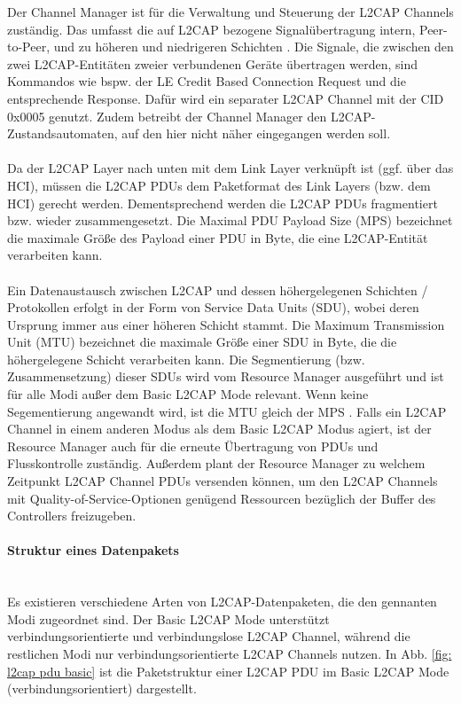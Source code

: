 Der Channel Manager ist für die Verwaltung und Steuerung der L2CAP Channels zuständig. Das umfasst die auf L2CAP bezogene Signalübertragung intern, Peer-to-Peer, und zu höheren und niedrigeren Schichten \cite{BtSpec4.0_1390}. 
Die Signale, die zwischen den zwei L2CAP-Entitäten zweier verbundenen Geräte übertragen werden, sind Kommandos wie bspw. der LE Credit Based Connection Request und die entsprechende Response. Dafür wird ein separater L2CAP Channel mit der CID 0x0005 genutzt. Zudem betreibt der Channel Manager den L2CAP-Zustandsautomaten, auf den hier nicht näher eingegangen werden soll.
\\\\
Da der L2CAP Layer nach unten mit dem Link Layer verknüpft ist (ggf. über das HCI), müssen die L2CAP PDUs dem Paketformat des Link Layers (bzw. dem HCI) gerecht werden. Dementsprechend werden die L2CAP PDUs fragmentiert bzw. wieder zusammengesetzt. Die Maximal PDU Payload Size (MPS) bezeichnet die maximale Größe des Payload einer PDU in Byte, die eine L2CAP-Entität verarbeiten kann.
\\\\
Ein Datenaustausch zwischen L2CAP und dessen höhergelegenen Schichten / Protokollen erfolgt in der Form von Service Data Units (SDU), wobei deren Ursprung immer aus einer höheren Schicht stammt. Die Maximum Transmission Unit (MTU) bezeichnet die maximale Größe einer SDU in Byte, die die höhergelegene Schicht verarbeiten kann. Die Segmentierung (bzw. Zusammensetzung) dieser SDUs wird vom Resource Manager ausgeführt und ist für alle Modi außer dem Basic L2CAP Mode relevant. Wenn keine Segementierung angewandt wird, ist die MTU gleich der MPS \cite{BtSpec4.2_1727}. Falls ein L2CAP Channel in einem anderen Modus als dem Basic L2CAP Modus agiert, ist der Resource Manager auch für die erneute Übertragung von PDUs und Flusskontrolle zuständig. Außerdem plant der Resource Manager zu welchem Zeitpunkt L2CAP Channel PDUs versenden können, um den L2CAP Channels mit Quality-of-Service-Optionen genügend Ressourcen bezüglich der Buffer des Controllers freizugeben. \cite{BtSpec4.2_185} \cite{BtSpec4.2_1725-1726}

\paragraph{Struktur eines Datenpakets} \mbox{} \vspace{0.2cm} \\
Es existieren verschiedene Arten von L2CAP-Datenpaketen, die den gennanten Modi zugeordnet sind. Der Basic L2CAP Mode unterstützt verbindungsorientierte und verbindungslose L2CAP Channel, während die restlichen Modi nur verbindungsorientierte L2CAP Channels nutzen.
In Abb. \ref{fig: l2cap pdu basic} ist die Paketstruktur einer L2CAP PDU im Basic L2CAP Mode (verbindungsorientiert) dargestellt.

